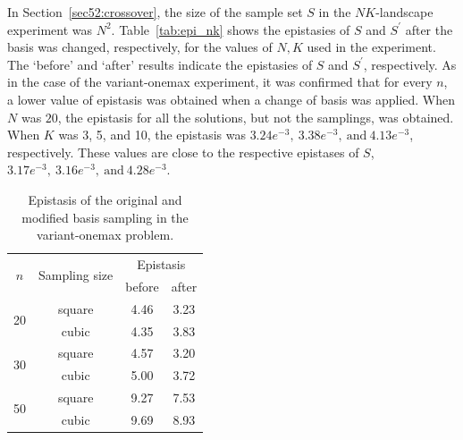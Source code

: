 In Section~\ref{sec52:crossover}, the size of the sample set $ S $ in the $ NK $-landscape experiment was $ N^2 $. Table~\ref{tab:epi_nk} shows the epistasies of $ S $ and $ S^\prime $ after the basis was changed, respectively, for the values of $ N,K $ used in the experiment. The `before' and `after' results indicate the epistasies of $ S $ and $ S^\prime $, respectively. As in the case of the variant-onemax experiment, it was confirmed that for every $ n $, a lower value of epistasis was obtained when a change of basis was applied. When $ N $ was $ 20 $, the epistasis for all the solutions, but not the samplings, was obtained. When $ K $ was 3, 5, and 10, the epistasis was $ 3.24e^{-3},\ 3.38e^{-3},\ \text{and}\ 4.13e^{-3} $, respectively. These values are close to the respective epistases of $ S $, $ 3.17e^{-3},\ 3.16e^{-3},\ \text{and}\ 4.28e^{-3} $.


\begin{table}[ht!]
	\caption{Epistasis of the original and modified basis sampling in the variant-onemax problem.} \label{tab:epi_var}
	\vspace*{0.2cm}
	\centering
	\begin{tabular}{cccc}
		\toprule
		\multirow{2}{*}{$ n $} & \multirow{2}{*}{Sampling size} & \multicolumn{2}{c}{Epistasis} \\	\cmidrule(lr){3-4}
		
		& & before & after \\
		\midrule
		\multirow{2}{*}{20} & square	& 4.46 & 3.23 \\
		& cubic		& 4.35 & 3.83 \\
		\midrule
		\multirow{2}{*}{30} & square	& 4.57 & 3.20 \\
		& cubic		& 5.00 & 3.72 \\
		\midrule
		\multirow{2}{*}{50} & square	& 9.27 & 7.53 \\
		& cubic		& 9.69 & 8.93 \\
		\bottomrule
	\end{tabular}
\end{table}

